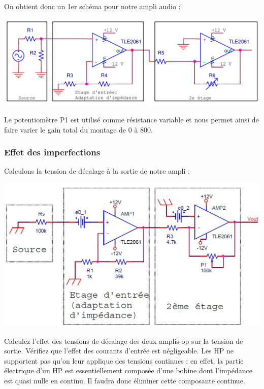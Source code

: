 \documentclass{../template/labo}
\begin{document}
On obtient donc un 1er schéma pour notre ampli audio :
\begin{center}
\includegraphics[width=14cm]{figures/AOP2etages}
\end{center}

Le potentiomètre P1 est utilisé comme résistance variable et nous permet ainsi de faire varier le gain total du montage de 0 à 800.

\subsubsection{Effet des imperfections}
Calculons la tension de décalage à la sortie de notre ampli :
\begin{center}
\includegraphics[width=14cm]{figures/AOPimperfections}
\end{center}
\Question
{
Calculez l'effet des tensions de décalage des deux amplis-op sur la tension de sortie.
}
{}
\Question
{
Vérifiez que l'effet des courants d'entrée est négligeable.
}
{}
Les HP ne supportent pas qu'on leur applique des tensions continues ; en effet, la partie électrique d'un HP est essentiellement composée d'une bobine dont l'impédance est quasi nulle en continu. Il faudra donc éliminer cette composante continue.
\end{document}
